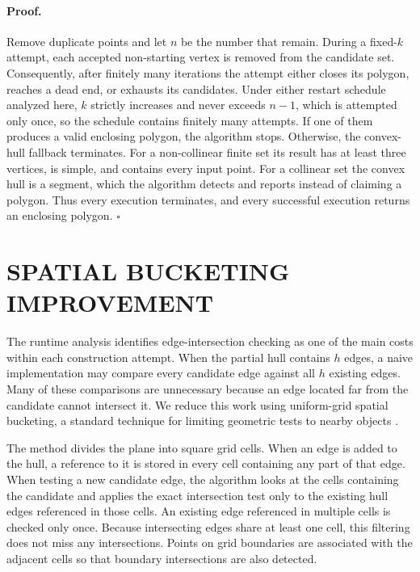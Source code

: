 \documentclass[a4paper,twoside]{article}
\begin{document}
\paragraph{Proof.}
Remove duplicate points and let \(n\) be the number that remain. During a fixed-\(k\) attempt, each accepted non-starting vertex is removed from the candidate set. Consequently, after finitely many iterations the attempt either closes its polygon, reaches a dead end, or exhausts its candidates. Under either restart schedule analyzed here, \(k\) strictly increases and never exceeds \(n-1\), which is attempted only once, so the schedule contains finitely many attempts. If one of them produces a valid enclosing polygon, the algorithm stops. Otherwise, the convex-hull fallback terminates. For a non-collinear finite set its result has at least three vertices, is simple, and contains every input point. For a collinear set the convex hull is a segment, which the algorithm detects and reports instead of claiming a polygon. Thus every execution terminates, and every successful execution returns an enclosing polygon. \(\square\)


\section{\uppercase{Spatial Bucketing Improvement}}

The runtime analysis identifies edge-intersection checking as one of the main costs within each construction attempt. When the partial hull contains \(h\) edges, a naive implementation may compare every candidate edge against all \(h\) existing edges. Many of these comparisons are unnecessary because an edge located far from the candidate cannot intersect it. We reduce this work using uniform-grid spatial bucketing, a standard technique for limiting geometric tests to nearby objects \cite{franklin1989}.

The method divides the plane into square grid cells. When an edge is added to the hull, a reference to it is stored in every cell containing any part of that edge. When testing a new candidate edge, the algorithm looks at the cells containing the candidate and applies the exact intersection test only to the existing hull edges referenced in those cells. An existing edge referenced in multiple cells is checked only once. Because intersecting edges share at least one cell, this filtering does not miss any intersections. Points on grid boundaries are associated with the adjacent cells so that boundary intersections are also detected.
\end{document}
